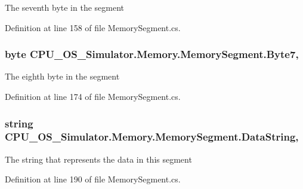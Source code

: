 The seventh byte in the segment 



Definition at line 158 of file Memory\+Segment.\+cs.

\hypertarget{class_c_p_u___o_s___simulator_1_1_memory_1_1_memory_segment_a62699911957af71d57e7cb5cd21d5246}{}
\subsubsection[{Byte7}]{\setlength{\rightskip}{0pt plus 5cm}byte C\+P\+U\+\_\+\+O\+S\+\_\+\+Simulator.\+Memory.\+Memory\+Segment.\+Byte7\hspace{0.3cm}{\ttfamily [get]}, {\ttfamily [set]}}\label{class_c_p_u___o_s___simulator_1_1_memory_1_1_memory_segment_a62699911957af71d57e7cb5cd21d5246}


The eighth byte in the segment 



Definition at line 174 of file Memory\+Segment.\+cs.

\hypertarget{class_c_p_u___o_s___simulator_1_1_memory_1_1_memory_segment_a5e2dec75bb2978188d1fb369e4f9e982}{}
\subsubsection[{Data\+String}]{\setlength{\rightskip}{0pt plus 5cm}string C\+P\+U\+\_\+\+O\+S\+\_\+\+Simulator.\+Memory.\+Memory\+Segment.\+Data\+String\hspace{0.3cm}{\ttfamily [get]}, {\ttfamily [set]}}\label{class_c_p_u___o_s___simulator_1_1_memory_1_1_memory_segment_a5e2dec75bb2978188d1fb369e4f9e982}


The string that represents the data in this segment 



Definition at line 190 of file Memory\+Segment.\+cs.

